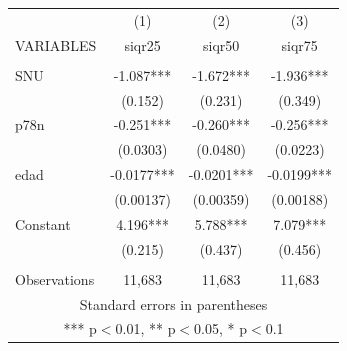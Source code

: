 \begin{tabular}{lccc} \hline
 & (1) & (2) & (3) \\
VARIABLES & siqr25 & siqr50 & siqr75 \\ \hline
 &  &  &  \\
SNU & -1.087*** & -1.672*** & -1.936*** \\
 & (0.152) & (0.231) & (0.349) \\
p78n & -0.251*** & -0.260*** & -0.256*** \\
 & (0.0303) & (0.0480) & (0.0223) \\
edad & -0.0177*** & -0.0201*** & -0.0199*** \\
 & (0.00137) & (0.00359) & (0.00188) \\
Constant & 4.196*** & 5.788*** & 7.079*** \\
 & (0.215) & (0.437) & (0.456) \\
 &  &  &  \\
 Observations & 11,683 & 11,683 & 11,683 \\ \hline
\multicolumn{4}{c}{ Standard errors in parentheses} \\
\multicolumn{4}{c}{ *** p$<$0.01, ** p$<$0.05, * p$<$0.1} \\
\end{tabular}
